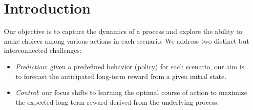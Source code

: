 \section{Introduction}

Our objective is to capture the dynamics of a process and explore the ability to make choices among various actions in each scenario. 
We address two distinct but interconnected challenges:
\begin{itemize}
\item \textit{Prediction}: given a predefined behavior (policy) for each scenario, our aim is to forecast the anticipated long-term reward from a given initial state.
\item \textit{Control}: our focus shifts to learning the optimal course of action to maximize the expected long-term reward derived from the underlying process.
\end{itemize}